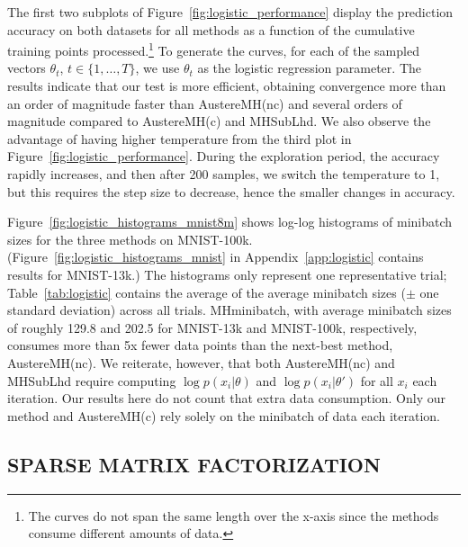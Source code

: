 \documentclass[letterpaper]{article}
\begin{document}
The first two subplots of Figure~\ref{fig:logistic_performance} display the
prediction accuracy on both datasets for all methods as a function of the
cumulative training points processed.\footnote{The curves do not span the same
length over the x-axis since the methods consume different amounts of data.} To
generate the curves, for each of the sampled vectors $\theta_t$,
$t\in\{1,\ldots,T\}$, we use $\theta_t$ as the logistic regression parameter.
The results indicate that our test is more efficient, obtaining convergence more
than an order of magnitude faster than {\sc AustereMH(nc)} and several orders of
magnitude compared to {\sc AustereMH(c)} and {\sc MHSubLhd}.  We also observe
the advantage of having higher temperature from the third plot in
Figure~\ref{fig:logistic_performance}. During the exploration period, the
accuracy rapidly increases, and then after 200 samples, we switch the
temperature to 1, but this requires the step size to decrease, hence the smaller
changes in accuracy.

Figure~\ref{fig:logistic_histograms_mnist8m} shows log-log histograms of
minibatch sizes for the three methods on MNIST-100k.
(Figure~\ref{fig:logistic_histograms_mnist} in Appendix~\ref{app:logistic}
contains results for MNIST-13k.) The histograms only represent one
representative trial; Table~\ref{tab:logistic} contains the average of the
average minibatch sizes ($\pm$ one standard deviation) across all trials. {\sc
MHminibatch}, with average minibatch sizes of roughly 129.8 and 202.5 for
MNIST-13k and MNIST-100k, respectively, consumes more than 5x fewer data points
than the next-best method, {\sc AustereMH(nc)}.  We reiterate, however, that
both {\sc AustereMH(nc)} and {\sc MHSubLhd} require computing $\log
p(x_i|\theta)$ and $\log p(x_i|\theta')$ for all $x_i$ each iteration. Our
results here do not count that extra data consumption. Only our method and {\sc
AustereMH(c)} rely solely on the minibatch of data each iteration.



\subsection{SPARSE MATRIX FACTORIZATION}\label{ssec:collab_filtering}
\end{document}
